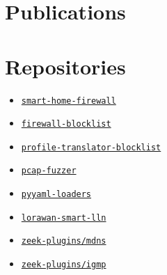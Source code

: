 \documentclass[]{deedy-resume-openfont}
\begin{document}
%
%

\begin{minipage}[t]{0.35\textwidth} 


\vspace{-5pt}
\section{Publications}
\vspace{0.7cm}
\renewcommand\refname{\vskip -1.5cm} %


\nocite{*}
\vspace{-11pt}



\section{Repositories}
\renewcommand\refname{\vskip -1.5cm} %
\begin{itemize}
    \item \href{https://github.com/smart-home-network-security/smart-home-firewall}{\texttt{smart-home-firewall}}
    \item \href{https://github.com/smart-home-network-security/firewall-blocklist}{\texttt{firewall-blocklist}}
    \item \href{https://github.com/smart-home-network-security/profile-translator-blocklist}{\texttt{profile-translator-blocklist}}
    \item \href{https://github.com/smart-home-network-security/pcap-fuzzer}{\texttt{pcap-fuzzer}}
    \item \href{https://github.com/smart-home-network-security/pyyaml-loaders}{\texttt{pyyaml-loaders}}
    \item \href{https://github.com/fdekeers/lorawan-smart-lln}{\texttt{lorawan-smart-lln}}
    \item \href{https://github.com/zeek-plugins/mdns}{\texttt{zeek-plugins/mdns}}
    \item \href{https://github.com/zeek-plugins/igmp}{\texttt{zeek-plugins/igmp}}
\end{itemize}
\vspace{-11pt}


\end{minipage}
\end{document}
